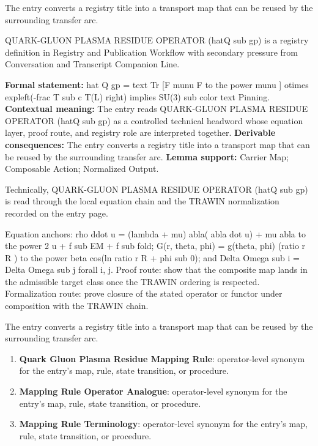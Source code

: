 The entry converts a registry title into a transport map that can be reused by the surrounding transfer arc.
\clearpage


\begingroup\small
{}
QUARK-GLUON PLASMA RESIDUE OPERATOR (hatQ sub gp) is a registry definition in Registry and Publication Workflow with secondary pressure from Conversation and Transcript Companion Line.

\begingroup\footnotesize\setlength{\emergencystretch}{3em}\sloppy
\textbf{Formal statement:} hat Q gp = text Tr [F munu F to the power munu ] otimes expleft(-frac T sub c T(L) right) implies SU(3) sub color text Pinning. \textbf{Contextual meaning:} The entry reads QUARK-GLUON PLASMA RESIDUE OPERATOR (hatQ sub gp) as a controlled technical headword whose equation layer, proof route, and registry role are interpreted together. \textbf{Derivable consequences:} The entry converts a registry title into a transport map that can be reused by the surrounding transfer arc. \textbf{Lemma support:} Carrier Map; Composable Action; Normalized Output.\par
\endgroup

Technically, QUARK-GLUON PLASMA RESIDUE OPERATOR (hatQ sub gp) is read through the local equation chain and the TRAWIN normalization recorded on the entry page.

Equation anchors: rho ddot u = (lambda + mu) abla( abla dot u) + mu abla to the power 2 u + f sub EM + f sub fold; G(r, theta, phi) = g(theta, phi) (ratio r R ) to the power beta cos(ln ratio r R + phi sub 0); and Delta Omega sub i = Delta Omega sub j forall i, j. Proof route: show that the composite map lands in the admissible target class once the TRAWIN ordering is respected. Formalization route: prove closure of the stated operator or functor under composition with the TRAWIN chain.

The entry converts a registry title into a transport map that can be reused by the surrounding transfer arc.
\endgroup

\begin{enumerate}[leftmargin=1.6em,itemsep=6pt,topsep=4pt]
\item \textbf{Quark Gluon Plasma Residue Mapping Rule}: operator-level synonym for the entry's map, rule, state transition, or procedure.
\item \textbf{Mapping Rule Operator Analogue}: operator-level synonym for the entry's map, rule, state transition, or procedure.
\item \textbf{Mapping Rule Terminology}: operator-level synonym for the entry's map, rule, state transition, or procedure.
\end{enumerate}

